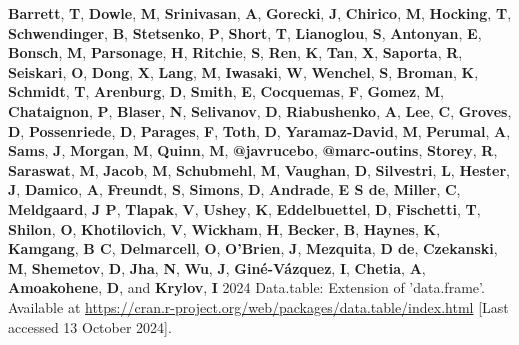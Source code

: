 \documentclass[
  american,
  10,
  a4paper,
]{book}
\newlength{\cslhangindent}
\newenvironment{CSLReferences}[2] %
 {\begin{list}{}{%
  \setlength{\itemindent}{0pt}
  \setlength{\leftmargin}{0pt}
  \setlength{\parsep}{0pt}
  \ifodd #1
   \setlength{\leftmargin}{\cslhangindent}
   \setlength{\itemindent}{-1\cslhangindent}
  \fi
  \setlength{\itemsep}{#2\baselineskip}}}
 {\end{list}}
\theoremstyle{definition}
\theoremstyle{remark}
\begin{document}
\label{refs}
\begin{CSLReferences}{0}{0}
\textbf{Barrett}, \textbf{T}, \textbf{Dowle}, \textbf{M},
\textbf{Srinivasan}, \textbf{A}, \textbf{Gorecki}, \textbf{J},
\textbf{Chirico}, \textbf{M}, \textbf{Hocking}, \textbf{T},
\textbf{Schwendinger}, \textbf{B}, \textbf{Stetsenko}, \textbf{P},
\textbf{Short}, \textbf{T}, \textbf{Lianoglou}, \textbf{S},
\textbf{Antonyan}, \textbf{E}, \textbf{Bonsch}, \textbf{M},
\textbf{Parsonage}, \textbf{H}, \textbf{Ritchie}, \textbf{S},
\textbf{Ren}, \textbf{K}, \textbf{Tan}, \textbf{X}, \textbf{Saporta},
\textbf{R}, \textbf{Seiskari}, \textbf{O}, \textbf{Dong}, \textbf{X},
\textbf{Lang}, \textbf{M}, \textbf{Iwasaki}, \textbf{W},
\textbf{Wenchel}, \textbf{S}, \textbf{Broman}, \textbf{K},
\textbf{Schmidt}, \textbf{T}, \textbf{Arenburg}, \textbf{D},
\textbf{Smith}, \textbf{E}, \textbf{Cocquemas}, \textbf{F},
\textbf{Gomez}, \textbf{M}, \textbf{Chataignon}, \textbf{P},
\textbf{Blaser}, \textbf{N}, \textbf{Selivanov}, \textbf{D},
\textbf{Riabushenko}, \textbf{A}, \textbf{Lee}, \textbf{C},
\textbf{Groves}, \textbf{D}, \textbf{Possenriede}, \textbf{D},
\textbf{Parages}, \textbf{F}, \textbf{Toth}, \textbf{D},
\textbf{Yaramaz-David}, \textbf{M}, \textbf{Perumal}, \textbf{A},
\textbf{Sams}, \textbf{J}, \textbf{Morgan}, \textbf{M}, \textbf{Quinn},
\textbf{M}, \textbf{@javrucebo}, \textbf{@marc-outins}, \textbf{Storey},
\textbf{R}, \textbf{Saraswat}, \textbf{M}, \textbf{Jacob}, \textbf{M},
\textbf{Schubmehl}, \textbf{M}, \textbf{Vaughan}, \textbf{D},
\textbf{Silvestri}, \textbf{L}, \textbf{Hester}, \textbf{J},
\textbf{Damico}, \textbf{A}, \textbf{Freundt}, \textbf{S},
\textbf{Simons}, \textbf{D}, \textbf{Andrade}, \textbf{E S de},
\textbf{Miller}, \textbf{C}, \textbf{Meldgaard}, \textbf{J P},
\textbf{Tlapak}, \textbf{V}, \textbf{Ushey}, \textbf{K},
\textbf{Eddelbuettel}, \textbf{D}, \textbf{Fischetti}, \textbf{T},
\textbf{Shilon}, \textbf{O}, \textbf{Khotilovich}, \textbf{V},
\textbf{Wickham}, \textbf{H}, \textbf{Becker}, \textbf{B},
\textbf{Haynes}, \textbf{K}, \textbf{Kamgang}, \textbf{B C},
\textbf{Delmarcell}, \textbf{O}, \textbf{O'Brien}, \textbf{J},
\textbf{Mezquita}, \textbf{D de}, \textbf{Czekanski}, \textbf{M},
\textbf{Shemetov}, \textbf{D}, \textbf{Jha}, \textbf{N}, \textbf{Wu},
\textbf{J}, \textbf{Giné-Vázquez}, \textbf{I}, \textbf{Chetia},
\textbf{A}, \textbf{Amoakohene}, \textbf{D}, and \textbf{Krylov},
\textbf{I} 2024 Data.table: {Extension} of 'data.frame'. Available at
\url{https://cran.r-project.org/web/packages/data.table/index.html}
{[}Last accessed 13 October 2024{]}.


\end{CSLReferences}
\end{document}
